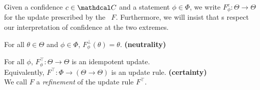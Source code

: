 Given a confidence $c \in \confdom$ and a statement $\phi \in \Phi$, we write
$F^c_\phi : \Theta \to \Theta$
for the update prescribed by the \cofunc\ $F$.
Furthermore, we will insist that \cofunc s respect our interpretation of confidence at the two extremes.
\begin{CFaxioms}
	\item
		For all $\theta \in \Theta$ and $\phi \in \Phi$, $F^{\bot}_\phi(\theta) = \theta$.
		\hfill \textbf{(neutrality)} \label{ax:zero}
	\item
		For all $\phi$,
		$F^\top_\phi : \Theta \to \Theta$
		is an idempotent update.\\
		Equivalently, $F^\top: \Phi \to (\Theta \to \Theta)$ is an update rule.
		\hfill \textbf{(certainty)} \label{ax:idemp}\\
		We call $F$ a \emph{refinement} of the update rule $F^\top$.
\end{CFaxioms}
